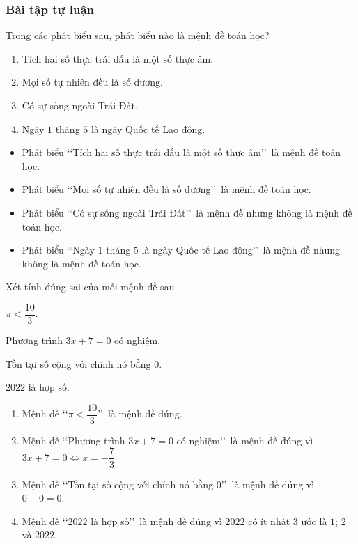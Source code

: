 \subsubsection{Bài tập tự luận}
\begin{bt}%
	Trong các phát biểu sau, phát biểu nào là mệnh đề toán học?
	\begin{enumerate}
		\item Tích hai số thực trái dấu là một số thực âm.
		\item Mọi số tự nhiên đều là số dương.
		\item Có sự sống ngoài Trái Đất.
		\item Ngày $1$ tháng $5$ là ngày Quốc tế Lao động.
	\end{enumerate}
	\loigiai
	{
		\begin{itemize}
			\item Phát biểu \lq\lq  Tích hai số thực trái dấu là một số thực âm\rq\rq\ là mệnh đề toán học.
			\item Phát biểu \lq\lq  Mọi số tự nhiên đều là số dương\rq\rq\ là mệnh đề toán học.
			\item Phát biểu \lq\lq  Có sự sống ngoài Trái Đất\rq\rq\ là mệnh đề nhưng không là mệnh đề toán học.
			\item Phát biểu \lq\lq  Ngày $1$ tháng $5$ là ngày Quốc tế Lao động\rq\rq\ là mệnh đề nhưng không là mệnh đề toán học.
		\end{itemize}
	}
\end{bt}
\begin{bt}%
	Xét tính đúng sai của mỗi mệnh đề sau
	\begin{listEX}[2]
		\item $\pi<\dfrac{10}{3}$.
		\item Phương trình $3x+7=0$ có nghiệm.
		\item Tồn tại số cộng với chính nó bằng $0$.
		\item $2022$ là hợp số.
	\end{listEX}
	\loigiai
	{
		\begin{enumerate}
			\item Mệnh đề \lq\lq  $\pi<\dfrac{10}{3}$\rq\rq\ là mệnh đề đúng.
			\item Mệnh đề \lq\lq  Phương trình $3x+7=0$ có nghiệm\rq\rq\ là mệnh đề đúng vì $3x+7=0 \Leftrightarrow x=-\dfrac{7}{3}$.
			\item Mệnh đề \lq\lq  Tồn tại số cộng với chính nó bằng $0$\rq\rq\ là mệnh đề đúng vì $0+0=0$.
			\item Mệnh đề \lq\lq  $2022$ là hợp số\rq\rq\ là mệnh đề đúng vì $2022$ có ít nhất $3$ ước là $1$; $2$ và $2022$.
		\end{enumerate}
	}
\end{bt}

